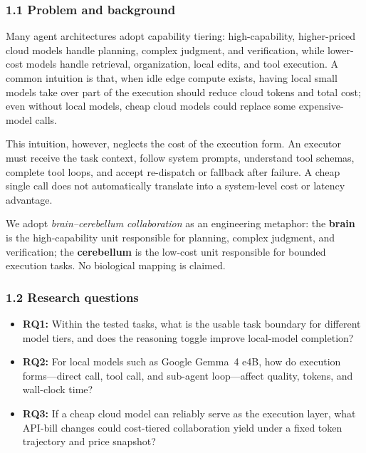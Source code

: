 \documentclass[
]{article}
\begin{document}
\subsubsection{1.1 Problem and background}
Many agent architectures adopt capability tiering: high-capability, higher-priced cloud models handle planning, complex judgment, and verification, while lower-cost models handle retrieval, organization, local edits, and tool execution. A common intuition is that, when idle edge compute exists, having local small models take over part of the execution should reduce cloud tokens and total cost; even without local models, cheap cloud models could replace some expensive-model calls.

This intuition, however, neglects the cost of the execution form. An executor must receive the task context, follow system prompts, understand tool schemas, complete tool loops, and accept re-dispatch or fallback after failure. A cheap single call does not automatically translate into a system-level cost or latency advantage.

We adopt \emph{brain--cerebellum collaboration} as an engineering metaphor: the \textbf{brain} is the high-capability unit responsible for planning, complex judgment, and verification; the \textbf{cerebellum} is the low-cost unit responsible for bounded execution tasks. No biological mapping is claimed.

\subsubsection{1.2 Research questions}
\begin{itemize}
\item \textbf{RQ1:} Within the tested tasks, what is the usable task boundary for different model tiers, and does the reasoning toggle improve local-model completion?
\item \textbf{RQ2:} For local models such as Google Gemma~4 e4B, how do execution forms---direct call, tool call, and sub-agent loop---affect quality, tokens, and wall-clock time?
\item \textbf{RQ3:} If a cheap cloud model can reliably serve as the execution layer, what API-bill changes could cost-tiered collaboration yield under a fixed token trajectory and price snapshot?
\end{itemize}
\end{document}
